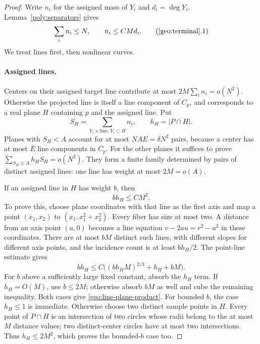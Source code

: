 \begin{proof}
Write $n_i$ for the assigned mass of $Y_i$ and $d_i=\deg Y_i$.
Lemma~\ref{poly:separators} gives
\[
 \sum_i n_i\le N,\qquad n_i\le C M d_i.
 \label{geo:curve-mass}\tag{\ref*{geo:terminal}.1}
\]
We treat lines first, then nonlinear curves.

\paragraph{Assigned lines.}
Centers on their assigned target line contribute at most
$2M\sum_i n_i=o(N^2)$. Otherwise the projected line is itself a
line component of $C_p$, and corresponds to a real plane $H$
containing $p$ and the assigned line. Put
\[
 S_H=\sum_{Y_i\text{ a line},\,Y_i\subset H}n_i,
 \qquad h_H=|P\cap H|.
\]
Planes with $S_H<A$ account for at most $NAE=\delta N^2$ pairs,
because a center has at most $E$ line components in $C_p$.
For the other planes it suffices to prove
$\sum_{S_H\ge A}h_HS_H=o(N^2)$.
They form a finite family determined by pairs of distinct assigned
lines: one line has weight at most $2M=o(A)$.

If an assigned line in $H$ has weight $b$, then
\begin{equation}\label{geo:line-plane-product}
 b h_H\le C M^2.
\end{equation}
To prove this, choose plane coordinates with that line as the first
axis and map a point $(x_1,x_2)$ to $(x_1,x_1^2+x_2^2)$.
Every fiber has size at most two. A distance from an axis point
$(a,0)$ becomes a line equation
$v-2au=r^2-a^2$ in these coordinates. There are at most $bM$ distinct
such lines, with different slopes for different axis points, and the
incidence count is at least $bh_H/2$. The point-line estimate gives
\[
 bh_H\le C\bigl((bh_HM)^{2/3}+h_H+bM\bigr).
\]
For $b$ above a sufficiently large fixed constant, absorb the $h_H$
term. If $h_H=O(M)$, use $b\le2M$; otherwise absorb $bM$ as well
and cube the remaining inequality. Both cases give
\eqref{geo:line-plane-product}. For bounded $b$, the case $h_H\le1$
is immediate. Otherwise choose two distinct
sample points in $H$. Every point of $P\cap H$ is an intersection of
two circles whose radii belong to the at most $M$ distance values;
two distinct-center circles have at most two intersections. Thus
$h_H\le2M^2$, which proves the bounded-$b$ case too.


\end{proof}
